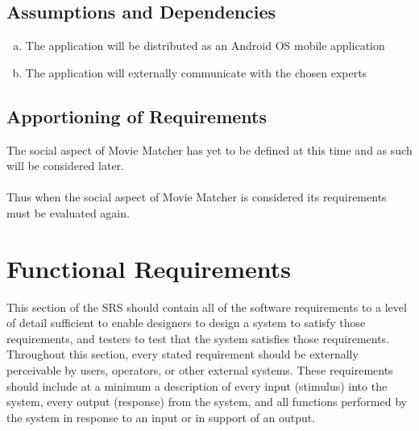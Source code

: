 \documentclass[]{article}
\begin{document}
\subsection{Assumptions and Dependencies}
\label{sub:assumptions_and_dependencies}
\begin{enumerate}[a)]
	\item The application will be distributed as an Android OS mobile application
	\item The application will externally communicate with the chosen experts
\end{enumerate}

\subsection{Apportioning of Requirements}
\label{sub:apportioning_of_requirements}
The social aspect of Movie Matcher has yet to be defined at this time and as such will be considered later.\\
\\
Thus when the social aspect of Movie Matcher is considered its requirements must be evaluated again.


\section{Functional Requirements}
\label{sec:functional_requirements}
This section of the SRS should contain all of the software requirements to a level of detail sufficient to enable designers to design a system to satisfy those requirements, and testers to test that the system satisfies those requirements. Throughout this section, every stated requirement should be externally perceivable by users, operators, or other external systems. These requirements should include at a minimum a description of every input (stimulus) into the system, every output (response) from the system, and all functions performed by the system in response to an input or in support of an output.
\end{document}
